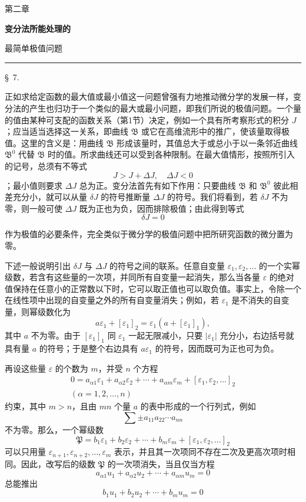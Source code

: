 \documentclass[11pt,a4paper,leqno]{article}
\begin{document}
\begin{center}
{\large 第二章}
\vspace{4mm}
{\Large\bfseries 变分法所能处理的\par 最简单极值问题}
\vspace{2mm}\rule{26mm}{0.4pt}\par
\end{center}

\begin{center}{\large \S~7.}\end{center}

正如求给定函数的最大值或最小值这一问题曾强有力地推动微分学的发展一样，变分法的产生也归功于一个类似的最大或最小问题，即我们所说的极值问题。一个量的值由某种可支配的函数关系（第1节）决定，例如一个具有所考察形式的积分 $J$；应当适当选择这一关系，即曲线 $\mathfrak{B}$ 或它在高维流形中的推广，使该量取得极值。这里的含义是：用曲线 $\mathfrak{B}$ 形成该量时，其值总大于或总小于以一条邻近曲线 $\mathfrak{B}^0$ 代替 $\mathfrak{B}$ 时的值。所求曲线还可以受到各种限制。在最大值情形，按照所引入的记号，总须有不等式
\[
J>J+\Delta J,\quad \Delta J<0
\]
；最小值则要求 $\Delta J$ 总为正。变分法首先有如下作用：只要曲线 $\mathfrak{B}$ 和 $\mathfrak{B}^0$ 彼此相差充分小，就可以从量 $\delta J$ 的符号推断量 $\Delta J$ 的符号。我们将看到，若 $\delta J$ 不为零，则一般可使 $\Delta J$ 既为正也为负，因而排除极值；由此得到等式
\[
\delta J=0
\]

作为极值的必要条件，完全类似于微分学的极值问题中把所研究函数的微分置为零。

下述一般说明引出 $\delta J$ 与 $\Delta J$ 的符号之间的联系。任意自变量 $\varepsilon_1,\varepsilon_2,\ldots$ 的一个实幂级数，若含有这些量的一次项，并同所有自变量一起消失，那么当各量 $\varepsilon$ 的绝对值保持在任意小的正常数以下时，它可以取正值也可以取负值。事实上，令除一个在线性项中出现的自变量之外的所有自变量消失；例如，若 $\varepsilon_1$ 是不消失的自变量，则幂级数化为
\[
a\varepsilon_1+[\varepsilon_1]_2=\varepsilon_1(a+[\varepsilon_1]_1),
\]
其中 $a$ 不为零。由于 $[\varepsilon_1]_1$ 同 $\varepsilon_1$ 一起无限减小，只要 $|\varepsilon_1|$ 充分小，右边括号就具有量 $a$ 的符号；于是整个右边具有 $a\varepsilon_1$ 的符号，因而既可为正也可为负。

再设这些量 $\varepsilon$ 的个数为 $m$，并受 $n$ 个方程
\begin{equation}\tag{9}
\begin{gathered}
0=a_{\alpha 1}\varepsilon_1+a_{\alpha 2}\varepsilon_2+\cdots+a_{\alpha m}\varepsilon_m+[\varepsilon_1,\varepsilon_2,\ldots]_2\\
(\alpha=1,2,\ldots,n)
\end{gathered}
\end{equation}
约束，其中 $m>n$，且由 $mn$ 个量 $a$ 的表中形成的一个行列式，例如
\[
\sum \pm a_{11}a_{22}\cdots a_{nn}
\]
不为零。那么，一个幂级数
\[
\mathfrak{P}=b_1\varepsilon_1+b_2\varepsilon_2+\cdots+b_m\varepsilon_m+[\varepsilon_1,\varepsilon_2,\ldots]_2
\]
可以只用量 $\varepsilon_{n+1},\varepsilon_{n+2},\ldots,\varepsilon_m$ 表示，并且其一次项同不存在二次及更高次项时相同。因此，改写后的级数 $\mathfrak{P}$ 的一次项消失，当且仅当方程
\[
a_{\alpha1}u_1+a_{\alpha2}u_2+\cdots+a_{\alpha m}u_m=0
\]
总能推出
\[
b_1u_1+b_2u_2+\cdots+b_mu_m=0
\]
\end{document}
